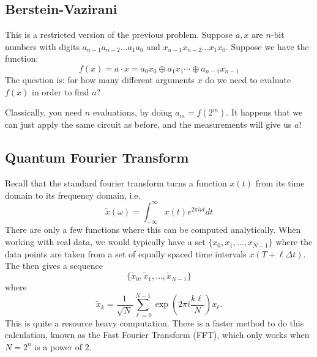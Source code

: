 \documentclass{article}
\numberwithin{equation}{section}
\begin{document}
\subsection{Berstein-Vazirani}
This is a restricted version of the previous problem. Suppose $a,x$ are $n$-bit numbers with digits $a_{n-1}a_{n-2}\dots a_1a_0$ and $x_{n-1}x_{n-2}\dots x_1x_0.$ Suppose we have the function:
\begin{equation*}
    f(x) = a \cdot x = a_0x_0 \oplus a_1x_1 \cdots \oplus a_{n-1}x_{n-1}
\end{equation*}
The question is: for how many different arguments $x$ do we need to evaluate $f(x)$ in order to find $a$?

Classically, you need $n$ evaluations, by doing $a_m = f(2^m)$.  It happens that we can just apply the same circuit as before, and the measurements will give us $a$!
\subsection{Quantum Fourier Transform}
Recall that the standard fourier transform turns a function $x(t)$ from its time domain to its frequency domain, i.e. 
\begin{equation*}
    \tilde{x}(\omega) = \int_{-\infty}^{\infty} x(t)e^{2\pi i\nu t} dt
\end{equation*}
There are only a few functions where this can be computed analytically. When working with real data, we would typically have a set $\{x_0, x_1, \dots, x_{N-1}\}$ where the data points are taken from a set of equally spaced time intervals $x(T+\ell \Delta t).$ The  then gives a sequence
\begin{equation*}
    \{\tilde{x}_0, \tilde{x}_1, \dots, \tilde{x}_{N-1}\}
\end{equation*}
where 
\begin{equation*}
    \tilde{x}_k = \frac{1}{\sqrt{N}}\sum_{\ell=0}^{N-1} \exp\left(2\pi i \frac{k \ell}{N}\right)x_\ell.
\end{equation*}
This is quite a resource heavy computation. There is a faster method to do this calculation, known as the Fast Fourier Transform (FFT), which only works when $N=2^n$ is a power of $2$.
\end{document}
